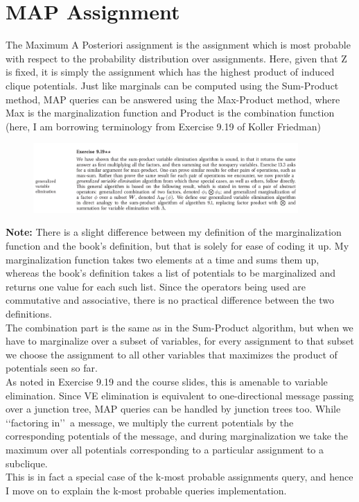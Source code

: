 \documentclass{article}
\begin{document}
\section{MAP Assignment}
The Maximum A Posteriori assignment is the assignment which is most probable with respect to the probability distribution over assignments. Here, given that Z is fixed, it is simply the assignment which has the highest product of induced clique potentials. Just like marginals can be computed using the Sum-Product method, MAP queries can be answered using the Max-Product method, where Max is the marginalization function and Product is the combination function (here, I am borrowing terminology from Exercise 9.19 of Koller Friedman)
\begin{figure}[H]
  \centering
  \includegraphics[width=0.9\textwidth]{Ex9.19-KF.png}
\end{figure} 
\textbf{Note: }There is a slight difference between my definition of the marginalization function and the book's definition, but that is solely for ease of coding it up. My marginalization function takes two elements at a time and sums them up, whereas the book's definition takes a list of potentials to be marginalized and returns one value for each such list. Since the operators being used are commutative and associative, there is no practical difference between the two definitions.\\
The combination part is the same as in the Sum-Product algorithm, but when we have to marginalize over a subset of variables, for every assignment to that subset we choose the assignment to all other variables that maximizes the product of potentials seen so far.\\
As noted in Exercise 9.19 and the course slides, this is amenable to variable elimination. Since VE elimination is equivalent to one-directional message passing over a junction tree, MAP queries can be handled by junction trees too. While \lq\lq factoring in\rq\rq\ a message, we multiply the current potentials by the corresponding potentials of the message, and during marginalization we take the maximum over all potentials corresponding to a particular assignment to a subclique.\\
This is in fact a special case of the k-most probable assignments query, and hence I move on to explain the k-most probable queries implementation.
\end{document}
